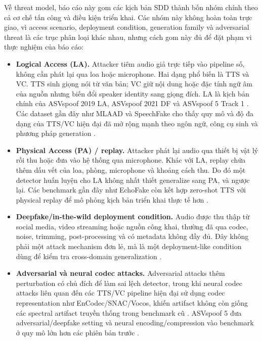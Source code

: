 Về threat model, báo cáo này gom các kịch bản SDD thành bốn nhóm chính theo cả cơ chế tấn công và điều kiện triển khai. Các nhóm này không hoàn toàn trực giao, vì access scenario, deployment condition, generation family và adversarial threat là các trục phân loại khác nhau, nhưng cách gom này đủ để đặt phạm vi thực nghiệm của báo cáo:
\begin{itemize}
    \item \textbf{Logical Access (LA).} Attacker tiêm audio giả trực tiếp vào pipeline số, không cần phát lại qua loa hoặc microphone. Hai dạng phổ biến là TTS và VC. TTS sinh giọng nói từ văn bản; VC giữ nội dung hoặc đặc tính ngữ âm của nguồn nhưng biến đổi speaker identity sang giọng đích. LA là kịch bản chính của ASVspoof 2019 LA, ASVspoof 2021 DF và ASVspoof 5 Track 1 \cite{asvspoof2019,asvspoof2021}. Các dataset gần đây như MLAAD và SpeechFake cho thấy quy mô và độ đa dạng của TTS/VC hiện đại đã mở rộng mạnh theo ngôn ngữ, công cụ sinh và phương pháp generation \cite{mlaad,speechfake}.
    \item \textbf{Physical Access (PA) / replay.} Attacker phát lại audio qua thiết bị vật lý rồi thu hoặc đưa vào hệ thống qua microphone. Khác với LA, replay chứa thêm dấu vết của loa, phòng, microphone và khoảng cách thu. Do đó một detector huấn luyện cho LA không nhất thiết generalize sang PA, và ngược lại. Các benchmark gần đây như EchoFake còn kết hợp zero-shot TTS với physical replay để mô phỏng kịch bản triển khai thực tế hơn \cite{asvspoof2019,echofake}.
    \item \textbf{Deepfake/in-the-wild deployment condition.} Audio được thu thập từ social media, video streaming hoặc nguồn công khai, thường đã qua codec, noise, trimming, post-processing và có metadata không đầy đủ. Đây không phải một attack mechanism đơn lẻ, mà là một deployment-like condition dùng để kiểm tra cross-domain generalization \cite{in_the_wild,sdd_survey}.
    \item \textbf{Adversarial và neural codec attacks.} Adversarial attacks thêm perturbation có chủ đích để làm sai lệch detector, trong khi neural codec attacks liên quan đến các TTS/VC pipeline hiện đại sử dụng codec representation như EnCodec/SNAC/Vocos, khiến artifact không còn giống các spectral artifact truyền thống trong benchmark cũ \cite{codecfake,codecfakeplus}. ASVspoof 5 đưa adversarial/deepfake setting và neural encoding/compression vào benchmark ở quy mô lớn hơn các phiên bản trước \cite{asvspoof5_arxiv2024,asvspoof5_design,asvspoof5_eval}.
\end{itemize}

